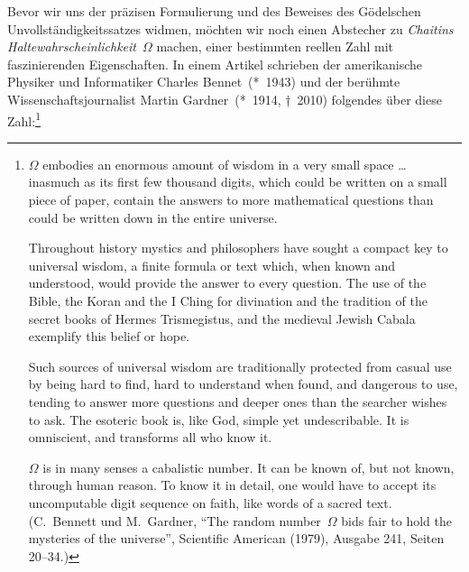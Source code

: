 \documentclass[twoside]{../zirkelblatt1415}
\theoremstyle{definition}
\theoremstyle{plain}
\theoremstyle{remark}
\begin{document}
Bevor wir uns der präzisen Formulierung und des Beweises des Gödelschen
Unvollständigkeitssatzes widmen, möchten wir noch einen Abstecher zu
\emph{Chaitins Haltewahrscheinlichkeit}~$\Omega$ machen, einer bestimmten
reellen Zahl mit faszinierenden Eigenschaften. In einem Artikel schrieben der
amerikanische Physiker und Informatiker Charles Bennet~(*~1943) und der
berühmte Wissenschaftsjournalist Martin Gardner~(*~1914, †~2010) folgendes über
diese Zahl:\footnote{$\Omega$ embodies an enormous amount of wisdom in a very
small space \ldots{} inasmuch as its first few thousand digits, which could be
written on a small piece of paper, contain the answers to more mathematical
questions than could be written down in the entire universe.

Throughout history mystics and philosophers have sought a compact
key to universal wisdom, a finite formula or text which, when known and
understood, would provide the answer to every question. The use of the Bible,
the Koran and the I Ching for divination and the tradition of the secret
books of Hermes Trismegistus, and the medieval Jewish Cabala exemplify this
belief or hope.

Such sources of universal wisdom are traditionally protected from casual use
by being hard to find, hard to understand when found, and dangerous to use,
tending to answer more questions and deeper ones than the searcher wishes to
ask. The esoteric book is, like God, simple yet undescribable. It is
omniscient, and transforms all who know it.

$\Omega$ is in many senses a cabalistic number. It can be known of, but not
known, through human reason. To know it in detail, one would have to accept
its uncomputable digit sequence on faith, like words of a sacred text.
(C.~Bennett und M.~Gardner, "`The random number~$\Omega$ bids fair to hold
the mysteries of the universe"', Scientific American (1979), Ausgabe 241,
Seiten 20--34.)}
\end{document}
